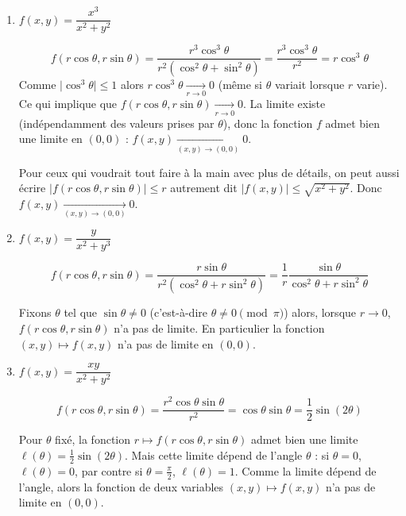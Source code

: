 \documentclass[12pt, class=report,crop=false]{standalone}
\begin{document}
\begin{exemple}
\sauteligne
\begin{enumerate}
  \item $f(x,y)=\dfrac{x^3}{x^2+y^2}$
  
  $$f(r\cos\theta,r\sin\theta) = \frac{r^3 \cos^3\theta}{r^2 (\cos^2\theta+\sin^2\theta)}
  = \frac{r^3 \cos^3\theta}{r^2} = r \cos^3 \theta$$
  Comme $\big| \cos^3 \theta \big| \le 1$ alors $r \cos^3 \theta \underset{r\to0}{\longrightarrow} 0$ (même si $\theta$ variait lorsque $r$ varie).
  Ce qui implique que $f(r\cos\theta,r\sin\theta) \underset{r\to0}{\longrightarrow} 0$.
  La limite existe (indépendamment des valeurs prises par $\theta$), donc 
  la fonction $f$ admet bien une limite en $(0,0)$ : $f(x,y) \underset{(x,y) \to (0,0)}{\longrightarrow} 0$.
  
  Pour ceux qui voudrait tout faire à la main avec plus de détails, on peut aussi écrire $\big|f(r\cos\theta,r\sin\theta)\big| \le r$ autrement dit $\big|f( x,y) \big| \le \sqrt{x^2+y^2}$. Donc $f(x,y) \underset{(x,y) \to (0,0)}{\longrightarrow} 0$.
  
   
  \item $f(x,y)=\dfrac{y}{x^2+y^3}$
  
  
 $$f(r\cos\theta,r\sin\theta) = \frac{r\sin\theta}{r^2(\cos^2\theta + r\sin^2\theta)} = \frac{1}{r} \frac{\sin\theta}{\cos^2\theta + r\sin^2\theta}$$
 
Fixons $\theta$ tel que $\sin \theta \neq 0$ (c'est-à-dire $\theta \neq 0 \pmod \pi$) alors, lorsque $r\to0$, $f(r\cos\theta,r\sin\theta)$ n'a pas de limite. En particulier la fonction $(x,y) \mapsto f(x,y)$ n'a pas de limite en $(0,0)$.
 
  
  \item  $f(x,y)=\dfrac{xy}{x^2+y^2}$
  
 $$f(r\cos\theta,r\sin\theta) = \frac{r^2 \cos\theta\sin\theta}{r^2}
  = \cos\theta \sin \theta = \frac12\sin(2\theta)$$ 

Pour $\theta$ fixé, la fonction $r \mapsto f(r\cos\theta,r\sin\theta)$ admet bien une limite $\ell(\theta) = \frac12\sin(2\theta)$. Mais cette limite dépend de l'angle $\theta$ :
si $\theta =0$, $\ell(\theta)=0$, par contre si $\theta = \frac\pi2$, $\ell(\theta) = 1$. Comme la limite dépend de l'angle, alors la fonction de deux variables $(x,y) \mapsto f(x,y)$ n'a pas de limite en $(0,0)$.
\end{enumerate}
\end{exemple}

 
\end{document}
